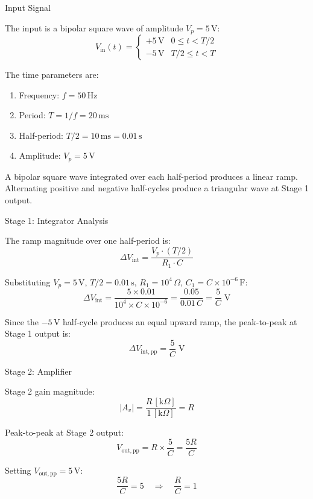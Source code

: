\documentclass{beamer}
\numberwithin{equation}{section}
\theoremstyle{remark}
\begin{document}
\begin{frame}{Input Signal}

The input is a bipolar square wave of amplitude $V_p = 5\,\mathrm{V}$:
\[
  V_{\mathrm{in}}(t) =
  \begin{cases}
    +5\,\mathrm{V} & 0 \le t  < T/2 \\
    -5\,\mathrm{V} & T/2 \le t < T
  \end{cases}
\]

The time parameters are:

\begin{enumerate}
  \item Frequency: $f = 50\,\mathrm{Hz}$
  \item Period: $T = 1/f = 20\,\mathrm{ms}$
  \item Half-period: $T/2 = 10\,\mathrm{ms} = 0.01\,\mathrm{s}$
  \item Amplitude: $V_p = 5\,\mathrm{V}$
\end{enumerate}

A bipolar square wave integrated over each half-period produces a
linear ramp. Alternating positive and negative half-cycles produce
a triangular wave at Stage 1 output.

\end{frame}

\begin{frame}{Stage 1: Integrator Analysis}

The ramp magnitude over one half-period is:
\[
  \Delta V_{\mathrm{int}}
  = \frac{V_p \cdot (T/2)}{R_1 \cdot C}
\]

Substituting $V_p = 5\,\mathrm{V}$, $T/2 = 0.01\,\mathrm{s}$,
$R_1 = 10^4\,\Omega$, $C_{1} = C \times 10^{-6}\,\mathrm{F}$:
\[
  \Delta V_{\mathrm{int}}
  = \frac{5 \times 0.01}{10^4 \times C \times 10^{-6}}
  = \frac{0.05}{0.01\,C}
  = \frac{5}{C}\;\mathrm{V}
\]

Since the $-5\,\mathrm{V}$ half-cycle produces an equal upward ramp,
the peak-to-peak at Stage 1 output is:
\[
  \Delta V_{\mathrm{int,pp}} = \frac{5}{C}\;\mathrm{V}
  \]

\end{frame}

\begin{frame}{Stage 2: Amplifier }

Stage 2 gain magnitude:
\[
  \left|A_v\right| = \frac{R\,[\mathrm{k}\Omega]}{1\,[\mathrm{k}\Omega]} = R
\]

Peak-to-peak at Stage 2 output:
\[
  V_{\mathrm{out,pp}} = R \times \frac{5}{C} = \frac{5R}{C}
\]

Setting $V_{\mathrm{out,pp}} = 5\,\mathrm{V}$:
\[
  \frac{5R}{C} = 5
  \quad\Longrightarrow\quad
  \frac{R}{C} = 1
  \]

\end{frame}
\end{document}

